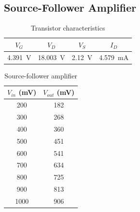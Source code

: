 \subsection{Source-Follower Amplifier}

\begin{table}[hbtp]
  \centering
  \begin{tabular}{cccc}
    $V_G$ & $V_D$ & $V_S$ & $I_D$ \\
    \hline
    \SI{4.391}{V} & \SI{18.003}{V} & \SI{2.12}{V} & \SI{4.579}{mA} \\
  \end{tabular}
  \caption{\label{tab:tran_follower} Transistor characteristics}
\end{table}

\begin{table}[hbtp]
  \centering
  \begin{tabular}{cc}
    $V_{in}$ (\si{mV}) & $V_{out}$ (\si{mV}) \\
    \hline
    200                & 182                 \\
    300                & 268                 \\
    400                & 360                 \\
    500                & 451                 \\
    600                & 541                 \\
    700                & 634                 \\
    800                & 725                 \\
    900                & 813                 \\
    1000               & 906                 \\
  \end{tabular}
  \caption{\label{tab:source-follower} Source-follower amplifier}
\end{table}


